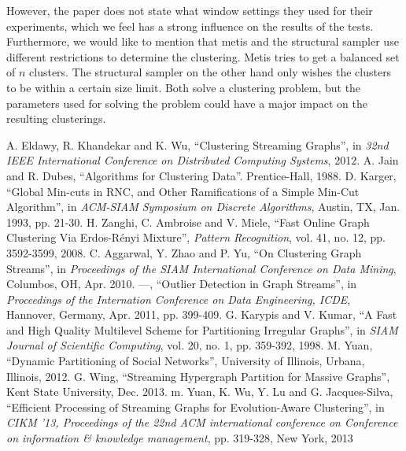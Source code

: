 \documentclass[a4paper]{article}
\begin{document}
However, the paper does not state what window settings they used for their experiments, which we feel has a strong influence on the results of the tests. Furthermore, we would like to mention that metis and the structural sampler use different restrictions to determine the clustering. Metis tries to get a balanced set of $n$ clusters. The structural sampler on the other hand only wishes the clusters to be within a certain size limit. Both solve a clustering problem, but the parameters used for solving the problem could have a major impact on the resulting clusterings.

\begin{thebibliography}{99}
 A. Eldawy, R. Khandekar and K. Wu, ``Clustering Streaming Graphs'', in \textit{32nd IEEE International Conference on Distributed Computing Systems}, 2012.
 A. Jain and R. Dubes, ``Algorithms for Clustering Data''. Prentice-Hall, 1988.
 D. Karger, ``Global Min-cuts in RNC, and Other Ramifications of a Simple Min-Cut Algorithm'', in \textit{ACM-SIAM Symposium on Discrete Algorithms}, Austin, TX, Jan. 1993, pp. 21-30.
 H. Zanghi, C. Ambroise and V. Miele, ``Fast Online Graph Clustering Via Erdos-Rényi Mixture'', \textit{Pattern Recognition}, vol. 41, no. 12, pp. 3592-3599, 2008.
 C. Aggarwal, Y. Zhao and P. Yu, ``On Clustering Graph Streams'', in \textit{Proceedings of the SIAM International Conference on Data Mining}, Columbos, OH, Apr. 2010.
 ---,  ``Outlier Detection in Graph Streams'', in \textit{Proceedings of the Internation Conference on Data Engineering, ICDE}, Hannover, Germany, Apr. 2011, pp. 399-409.
 G. Karypis and V. Kumar, ``A Fast and High Quality Multilevel Scheme for Partitioning Irregular Graphs'', in \textit{SIAM Journal of Scientific Computing}, vol. 20, no. 1, pp. 359-392, 1998.
 M. Yuan, ``Dynamic Partitioning of Social Networks'', University of Illinois, Urbana, Illinois, 2012.
 G. Wing, ``Streaming Hypergraph Partition for Massive Graphs'', Kent State University, Dec. 2013.
 m. Yuan, K. Wu, Y. Lu and G. Jacques-Silva, ``Efficient Processing of Streaming Graphs for Evolution-Aware Clustering'', in \textit{CIKM '13, Proceedings of the 22nd ACM international conference on Conference on information \& knowledge management}, pp. 319-328, New York, 2013
\end{thebibliography}
\end{document}
